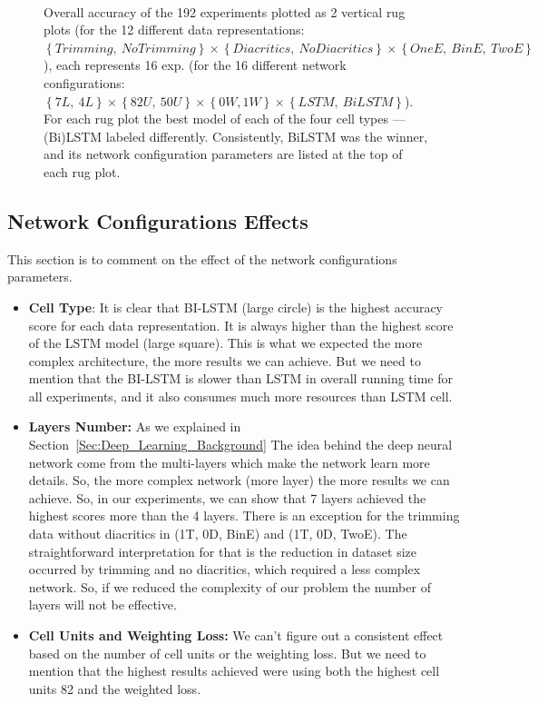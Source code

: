 \begin{figure}[!t]
  
  \caption{Overall accuracy of the 192 experiments plotted as 2 vertical rug plots (for the 12 different data representations: $\left\{\mathit{Trimming},\ \mathit{No Trimming} \right\} \times \left\{\mathit{Diacritics},\ \mathit{No Diacritics} \right\} \times \left\{\mathit{OneE},\ \mathit{BinE},\ \mathit{TwoE}\right\}$), each represents 16 exp. (for the 16 different network configurations: $\left\{7L,\ 4L\right\} \times \left\{82U,\ 50U\right\} \times \left\{0W, 1W\right\} \times \left\{LSTM,\ BiLSTM\right\}$). For each rug plot the best model of each of the four cell types ---(Bi)LSTM labeled differently. Consistently, BiLSTM  was the winner, and its network configuration parameters are listed at the top of each rug plot.}~\label{Fig:ArabicModelsResults}
\end{figure}



\subsection{Network Configurations Effects}

This section is to comment on the effect of the network configurations parameters.
\begin{itemize}
  \item \textbf{Cell Type}: It is clear that BI-LSTM  (large circle) is the highest accuracy score for each data representation. It is always higher than the highest score of the LSTM model (large square). This is what we expected the more complex architecture, the more results we can achieve. But we need to mention that the BI-LSTM is slower than LSTM in overall running time for all experiments, and it also consumes much more resources than LSTM cell.
  \item \textbf{Layers Number:} As we explained in Section~\ref{Sec:Deep_Learning_Background} The idea behind the deep neural network come from the multi-layers which make the network learn more details. So, the more complex network (more layer) the more results we can achieve. So, in our experiments, we can show that 7 layers achieved the highest scores more than the 4 layers. There is an exception for the trimming data without diacritics in (1T, 0D, BinE) and (1T, 0D, TwoE). The straightforward interpretation for that is the reduction in dataset size occurred by trimming and no diacritics, which required a less complex network. So, if we reduced the complexity of our problem the number of layers will not be effective.

  \item \textbf{Cell Units and Weighting Loss:} We can't figure out a consistent effect based on the number of cell units or the weighting loss. But we need to mention that the highest results achieved were using both the highest cell units 82 and the weighted loss.
\end{itemize}



